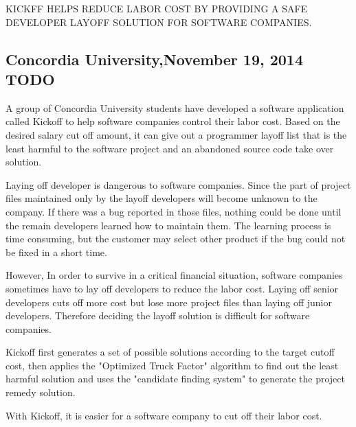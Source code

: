 
\uppercase{Kickff helps reduce labor cost by providing a safe developer layoff solution for software companies.}
\subsection*{Concordia University,November 19, 2014 TODO}
A group of Concordia University students have developed a software application called Kickoff to help software companies control their labor cost. Based on the desired salary cut off amount, it can give out a programmer layoff list that is the least harmful to the software project and an abandoned source code take over solution.

Laying  off developer is dangerous to software companies. Since the part of project files maintained only by the layoff developers will become unknown to the company. If there was a bug reported in those files, nothing could be done until the remain developers learned how to maintain them. The learning process is time consuming, but the customer may select other product if the bug could not be fixed in a short time.  

However, In order to survive in a critical financial situation, software companies sometimes have to lay off developers to reduce the labor cost. Laying off senior developers cuts off more cost but lose more project files than laying off junior developers. Therefore deciding the layoff solution is difficult for software companies.

Kickoff first generates a set of possible solutions according to the target cutoff cost, then applies the "Optimized Truck Factor" algorithm to find out the least harmful solution and uses the "candidate finding system" to generate the project remedy solution. 

With Kickoff, it is easier for a software company to cut off their labor cost.  




